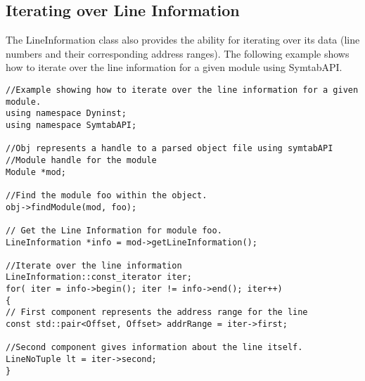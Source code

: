 \subsection{Iterating over Line Information}\label{LineNoIterating}
The LineInformation class also provides the ability for iterating over its data (line numbers and their corresponding address ranges). The following example shows how to iterate over the line information for a given module using SymtabAPI.

\begin{lstlisting}
//Example showing how to iterate over the line information for a given module.
using namespace Dyninst;
using namespace SymtabAPI;

//Obj represents a handle to a parsed object file using symtabAPI
//Module handle for the module
Module *mod;

//Find the module foo within the object.
obj->findModule(mod, foo);

// Get the Line Information for module foo.
LineInformation *info = mod->getLineInformation();

//Iterate over the line information
LineInformation::const_iterator iter;
for( iter = info->begin(); iter != info->end(); iter++)
{
// First component represents the address range for the line
const std::pair<Offset, Offset> addrRange = iter->first;

//Second component gives information about the line itself.
LineNoTuple lt = iter->second;
}
\end{lstlisting}
